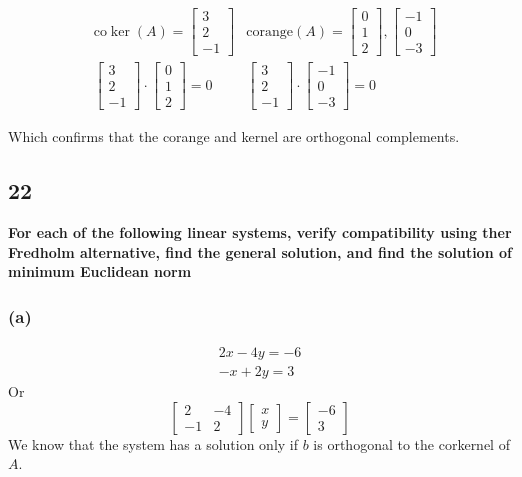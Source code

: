 \documentclass[10pt,letterpaper]{article}
\begin{document}
	\begin{align*}
	& \text{co}\ker(A) = \begin{bmatrix}
	3 \\ 2 \\ -1
	\end{bmatrix} & \text{corange}(A) = \begin{bmatrix}
	0 \\ 1 \\ 2
	\end{bmatrix}, \begin{bmatrix}
	-1 \\ 0 \\ -3
	\end{bmatrix} \\
	& \boxed{\begin{bmatrix}
		3 \\ 2 \\ -1
		\end{bmatrix} \cdot \begin{bmatrix}
		0 \\ 1 \\ 2
		\end{bmatrix} = 0} & \boxed{\begin{bmatrix}
		3 \\ 2 \\ -1
		\end{bmatrix} \cdot \begin{bmatrix}
		-1 \\ 0 \\ -3
		\end{bmatrix} = 0}
	\end{align*}
	
	Which confirms that the corange and kernel are orthogonal complements. 
		
	\subsection*{22} \textbf{For each of the following linear systems, verify compatibility using ther Fredholm alternative, find the general solution, and find the solution of minimum Euclidean norm}
	\subsubsection*{(a)} 
	$$
	\begin{array}{c}
	2x - 4y = -6 \\ -x + 2y = 3
	\end{array}
	$$
	Or 
	$$
	\begin{bmatrix}
	2 & -4 \\ -1 & 2
	\end{bmatrix} \begin{bmatrix}
	x \\ y
	\end{bmatrix} = \begin{bmatrix}
	-6 \\ 3
	\end{bmatrix}
	$$
	We know that the system has a solution only if $b$ is orthogonal to the corkernel of $A$. 
	
\end{document}
